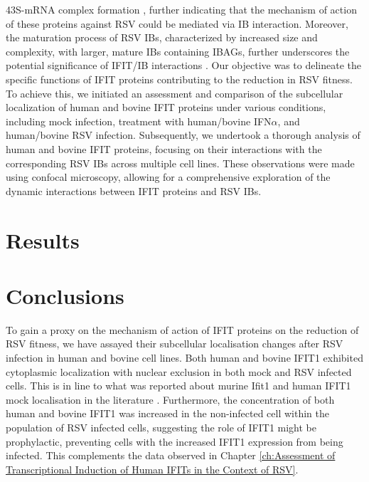 43S-mRNA complex formation \cite{Diamond2014IFIT1:Translation, Guo2000CharacterizationVirus}, further indicating that the mechanism of action of these proteins against RSV could be mediated via IB interaction. Moreover, the maturation process of RSV IBs, characterized by increased size and complexity, with larger, mature IBs containing IBAGs, further underscores the potential significance of IFIT/IB interactions \cite{Rincheval2017FunctionalVirus, Jobe2021BovineResponses}. Our objective was to delineate the specific functions of IFIT proteins contributing to the reduction in RSV fitness. To achieve this, we initiated an assessment and comparison of the subcellular localization of human and bovine IFIT proteins under various conditions, including mock infection, treatment with human/bovine IFN\(\alpha\), and human/bovine RSV infection. Subsequently, we undertook a thorough analysis of human and bovine IFIT proteins, focusing on their interactions with the corresponding RSV IBs across multiple cell lines. These observations were made using confocal microscopy, allowing for a comprehensive exploration of the dynamic interactions between IFIT proteins and RSV IBs.

\section{Results} \label{sec:Results-Chapter3}



\section{Conclusions} \label{sec:Conclusions-Chapter3}
To gain a proxy on the mechanism of action of IFIT proteins on the reduction of RSV fitness, we have assayed their subcellular localisation changes after RSV infection in human and bovine cell lines. Both human and bovine IFIT1 exhibited cytoplasmic localization with nuclear exclusion in both mock and RSV infected cells. This is in line to what was reported about murine Ifit1 and human IFIT1 mock localisation in the literature \cite{Pichlmair2011IFIT1RNA, Terenzi2008Interferon-inducibleE1, Thul2017AProteome}. Furthermore, the concentration of both human and bovine IFIT1 was increased in the non-infected cell within the population of RSV infected cells, suggesting the role of IFIT1 might be prophylactic, preventing cells with the increased IFIT1 expression from being infected. This complements the data observed in Chapter \ref{ch:Assessment of Transcriptional Induction of Human IFITs in the Context of RSV}. 


